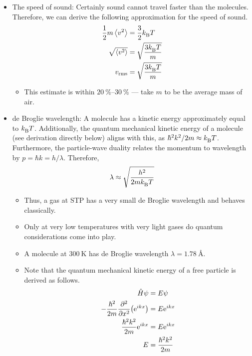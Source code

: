 \documentclass[../notes.tex]{subfiles}
\begin{document}
\begin{itemize}
\begin{itemize}
\begin{itemize}
        \end{itemize}
        \item The speed of sound: Certainly sound cannot travel faster than the molecules. Therefore, we can derive the following approximation for the speed of sound.
        \begin{align*}
            \frac{1}{2}m\prb{v^2} &= \frac{3}{2}\kB T\\
            \sqrt{\prb{v^2}} &= \sqrt{\frac{3\kB T}{m}}\\
            v_\text{rms} &= \sqrt{\frac{3\kB T}{m}}
        \end{align*}
        \begin{itemize}
            \item This estimate is within $\SIrange{20}{30}{\percent}$ --- take $m$ to be the average mass of air.
        \end{itemize}
        \item de Broglie wavelength: A molecule has a kinetic energy approximately equal to $\kB T$. Additionally, the quantum mechanical kinetic energy of a molecule (see derivation directly below) aligns with this, as $\hbar^2k^2/2m\approx \kB T$. Furthermore, the particle-wave duality relates the momentum to wavelength by $p=\hbar k=h/\lambda$. Therefore,
        \begin{equation*}
            \lambda \approx \sqrt{\frac{h^2}{2m\kB T}}
        \end{equation*}
        \begin{itemize}
            \item Thus, a gas at STP has a very small de Broglie wavelength and behaves classically.
            \item Only at very low temperatures with very light gases do quantum considerations come into play.
            \item A  molecule at $\SI{300}{\kelvin}$ has de Broglie wavelength $\lambda=\SI{1.78}{\angstrom}$.
            \item Note that the quantum mechanical kinetic energy of a free particle is derived as follows.
            \begin{align*}
                \hat{H}\psi &= E\psi\\
                -\frac{\hbar^2}{2m}\pdv[2]{x}(\e[ikx]) &= E\e[ikx]\\
                \frac{\hbar^2k^2}{2m}\e[ikx] &= E\e[ikx]\\
                E &= \frac{\hbar^2k^2}{2m}
            \end{align*}

\end{itemize}
\end{itemize}
\end{itemize}
\end{document}
